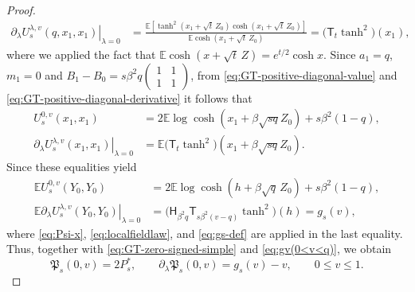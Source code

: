 \documentclass[11pt]{article}
\numberwithin{equation}{section}
\newcommand{\E}{\mathbb{E}}
\newcommand{\1}{\mathbf 1}
\begin{document}
\begin{proof}
\begin{align}
%
\left.\partial_\lambda U_s^{\lambda,v}(q,x_1,x_1) \right|_{\lambda=0} &= \frac{\E[\tanh^2(x_1 +\sqrt t\,Z_0 )
                \cosh(x_1 +\sqrt t\,Z_0 )]}
         {\E\cosh(x_1 +\sqrt t\,Z_0 )}
 =\bigl(\mathsf T_t\tanh^2\bigr)(x_1) , \label{eq:GT-positive-diagonal-derivative}
\end{align}
where we applied the fact that $\E\cosh(x+\sqrt t\,Z)=e^{t/2}\cosh x$.
Since $a_1 = q$, $m_1 = 0$ and $B_1 - B_0 = s\beta ^2 q \left( \begin{array}{cc} 1&1\\ 1&1 \end{array}\right)$, from \eqref{eq:GT-positive-diagonal-value} and \eqref{eq:GT-positive-diagonal-derivative} it follows that
\begin{align*}
U_s^{0,v}(x_1 ,x_1) &= 2 \E \log\cosh (x_1 + \beta \sqrt{sq} Z_0) +s\beta^2(1-q) , \\
%
\left.\partial_\lambda U_s^{\lambda,v}(x_1,x_1) \right|_{\lambda=0} &= \E \bigl(\mathsf T_t\tanh^2\bigr)(x_1 + \beta \sqrt{sq} Z_0) .
\end{align*}
Since these equalities yield
\begin{align*}
 \E U_s^{0,v}(Y_0,Y_0) & = 2\E\log\cosh(h+\beta\sqrt q\,Z_0)+s\beta^2(1-q) , \\
 \E\left. \partial_\lambda U_s^{\lambda,v}(Y_0,Y_0) \right|_{\lambda=0}&= \bigl(\mathsf H_{\beta^2q} \mathsf T_{s\beta^2(v-q)}\tanh^2\bigr)(h)
 =g_s(v),
\end{align*}
where \eqref{eq:Psi-x}, \eqref{eq:localfieldlaw}, and \eqref{eq:gs-def} are applied in the last equality.
Thus, together with \eqref{eq:GT-zero-signed-simple} and \eqref{eq:gv(0<v<q)}, we obtain
\begin{equation}
 \mathfrak P_s(0,v)=2P_s^*,
 \qquad
 \partial_\lambda\mathfrak P_s(0,v)=g_s(v)-v,
 \qquad 0\le v\le1.
 \label{eq:GT-zero-positive-simple}
\end{equation}


\end{proof}
\end{document}

